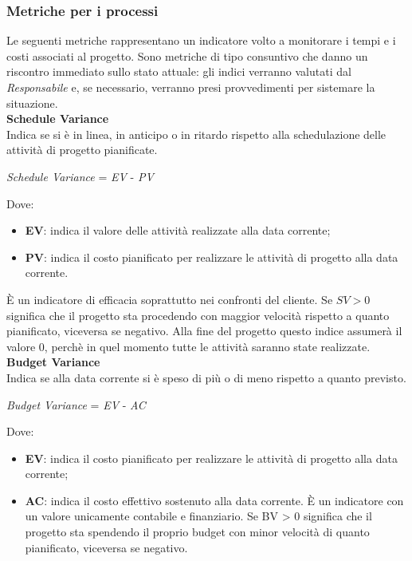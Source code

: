 \subsubsection{Metriche per i processi}\label{MetricheProc}
\hypertarget{metriche_processi}{}
Le seguenti metriche rappresentano un indicatore volto a monitorare i tempi e i costi associati al progetto. Sono metriche di tipo consuntivo che danno un riscontro immediato sullo stato attuale: gli indici verranno valutati dal \textit{Responsabile} e, se necessario, verranno presi provvedimenti per sistemare la situazione.\\

\textbf{Schedule Variance}\\

Indica se si è in linea, in anticipo o in ritardo rispetto alla schedulazione delle attività di progetto
pianificate.
\begin{center}
	\textit{Schedule Variance} = \textit{EV} - \textit{PV} 
\end{center}
Dove:
\begin{itemize}
	\item \textbf{EV}: indica il valore delle attivit\`a realizzate alla data corrente;
	\item \textbf{PV}: indica il costo pianificato per realizzare le attività di progetto alla data corrente.
\end{itemize}
\`E un indicatore di efficacia soprattutto nei confronti del cliente. Se \begin{math}{SV > 0}\end{math} significa che il progetto sta procedendo con maggior velocit\`a rispetto a quanto pianificato, viceversa se negativo. Alla fine del progetto questo indice assumer\`a il valore 0, perch\`e in quel momento tutte le attivit\`a saranno state realizzate.\\

\textbf{Budget Variance}\\

Indica se alla data corrente si \`e speso di pi\`u o di meno rispetto a quanto previsto.\\
\begin{center}
	\textit{Budget Variance} = \textit{EV} - \textit{AC}
\end{center}
Dove:
\begin{itemize}
	\item \textbf{EV}: indica il costo pianificato per realizzare le attività di progetto alla data corrente;
	\item \textbf{AC}: indica il costo effettivo sostenuto alla data corrente. \`E un indicatore con
un valore unicamente contabile e finanziario. Se BV > 0 significa che il progetto sta spendendo
il proprio budget con minor velocità di quanto pianificato, viceversa se negativo.
\end{itemize}

